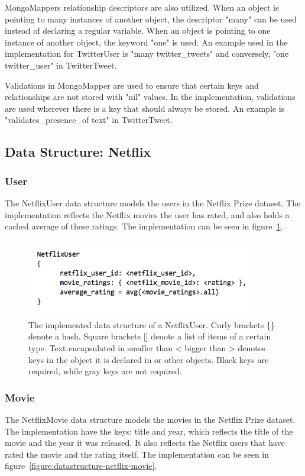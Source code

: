 MongoMappers relationship descriptors are also utilized. When an object is pointing to many instances of another object, the descriptor "many" can be used instead of declaring a regular variable. When an object is pointing to one instance of another object, the keyword "one" is used. An example used in the implementation for TwitterUser is "many twitter\_tweets" and conversely, "one twitter\_user" in TwitterTweet.

Validations in MongoMapper are used to ensure that certain keys and relationships are not stored with "nil" values. In the implementation, validations are used wherever there is a key that should always be stored. An example is "validates\_presence\_of text" in TwitterTweet.


\subsection{Data Structure: Netflix}

\subsubsection{User}
The NetflixUser data structure models the users in the Netflix Prize dataset. The implementation reflects the Netflix movies the user has rated, and also holds a cached average of these ratings. The implementation can be seen in figure~\ref{figure:datastructure-netflix-user}.

	\begin{figure}[H]
	\includegraphics[width=4in]{image/datastructure-netflix-user.png}
	\centering
	\caption[NetflixUser data structure]{The implemented data structure of a NetflixUser. Curly brackets \{\} denote a hash. Square brackets [] denote a list of items of a certain type. Text encapsulated in smaller than < bigger than > denotes keys in the object it is declared in or other objects. Black keys are required, while gray keys are not required.}
	\label{figure:datastructure-netflix-user}
	\end{figure}

\subsubsection{Movie}
The NetflixMovie data structure models the movies in the Netflix Prize dataset. The implementation have the keys: title and year, which reflects the title of the movie and the year it was released. It also reflects the Netflix users that have rated the movie and the rating itself. The implementation can be seen in figure~\ref{figure:datastructure-netflix-movie}.


